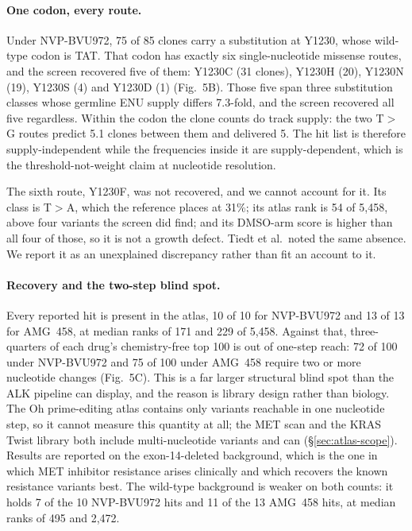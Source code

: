 \documentclass[11pt,a4paper]{article}
\begin{document}
\paragraph{One codon, every route.}
Under NVP-BVU972, 75 of 85 clones carry a substitution at Y1230, whose
wild-type codon is TAT. That codon has exactly six single-nucleotide
missense routes, and the screen recovered five of them: Y1230C (31
clones), Y1230H (20), Y1230N (19), Y1230S (4) and Y1230D (1)
(Fig.~5B). Those five span three substitution classes whose
germline ENU supply differs 7.3-fold, and the screen recovered all five regardless. Within
the codon the clone counts do track supply: the two T$>$G routes predict
5.1 clones between them and delivered 5. The hit list is therefore
supply-independent while the frequencies inside it are supply-dependent,
which is the threshold-not-weight claim at nucleotide resolution.

The sixth route, Y1230F, was not recovered, and we cannot account for
it. Its class is T$>$A, which the reference places at 31\%; its atlas
rank is 54 of 5,458, above four variants the screen did find; and its
DMSO-arm score is higher than all four of those, so it is not a growth
defect. Tiedt et al.\ noted the same absence. We report it as an
unexplained discrepancy rather than fit an account to it.

\paragraph{Recovery and the two-step blind spot.}
Every reported hit is present in the atlas, 10 of 10 for NVP-BVU972 and
13 of 13 for AMG~458, at median ranks of 171 and 229 of 5,458. Against
that, three-quarters of each drug's chemistry-free top 100 is out of
one-step reach: 72 of 100 under NVP-BVU972 and 75 of 100 under AMG~458
require two or more nucleotide changes (Fig.~5C). This is a far
larger structural blind spot than the ALK pipeline can display, and the
reason is library design rather than biology. The Oh prime-editing atlas
contains only variants reachable in one nucleotide step, so it cannot
measure this quantity at all; the MET scan and the KRAS Twist library
both include multi-nucleotide variants and can
(\S\ref{sec:atlas-scope}). Results are reported on the
exon-14-deleted background, which is the one in which MET inhibitor
resistance arises clinically and which recovers the known resistance
variants best. The wild-type background is weaker on both counts: it
holds 7 of the 10 NVP-BVU972 hits and 11 of the 13 AMG~458 hits, at
median ranks of 495 and 2,472.
\end{document}
